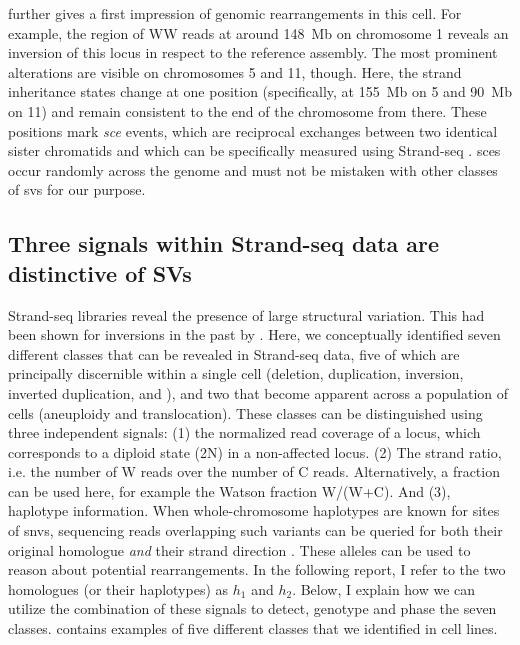  further gives a first impression of genomic rearrangements
in this cell. For example, the region of WW reads at around 148~Mb on chromosome
1 reveals an inversion of this locus in respect to the reference assembly. The
most prominent alterations are visible on chromosomes 5 and 11, though. Here,
the strand inheritance states change at one position (specifically,
at 155~Mb on 5 and 90~Mb on 11) and remain consistent to
the end of the chromosome from there. These positions mark \emph{\acf{sce}} events,
which are reciprocal exchanges between two identical sister chromatids and
which can be specifically measured using Strand-seq \citep{Falconer2012}.
\Acp{sce} occur randomly across the genome and must not be mistaken with other
classes of \acp{sv} for our purpose.





\subsection{Three signals within Strand-seq data are distinctive of SVs}
\label{sec:mosaic_concept}

Strand-seq libraries reveal the presence of large structural variation. This had been shown
for inversions in the past by \citet{Sanders2016}. Here, we conceptually identified seven
different \sv classes that can be revealed in Strand-seq data, five of which are
principally discernible within a single cell (deletion, duplication, inversion,
inverted duplication, and \loh), and two that become apparent across a population
of cells (aneuploidy and translocation). These \sv classes can be distinguished
using three independent signals: (1) the normalized read coverage of a locus,
which corresponds to a diploid state (2N) in a non-affected locus.
(2) The strand ratio, i.e. the number of W reads over the number of C reads.
Alternatively, a fraction can be used here, for example the Watson fraction
W/(W+C). And (3), haplotype information. When whole-chromosome haplotypes are known
for sites of \acp{snv}, sequencing reads overlapping such variants can be queried for
both their original homologue \emph{and} their strand direction \citep{Porubsky2016}.
These alleles can be used to reason about potential rearrangements. In the
following report, I refer to the two homologues (or their haplotypes) as $h_1$
and $h_2$.
Below, I explain how we can utilize the combination of these signals to detect,
genotype and phase the seven \sv classes.  contains examples of
five different \sv classes that we identified in \rpe cell lines.

